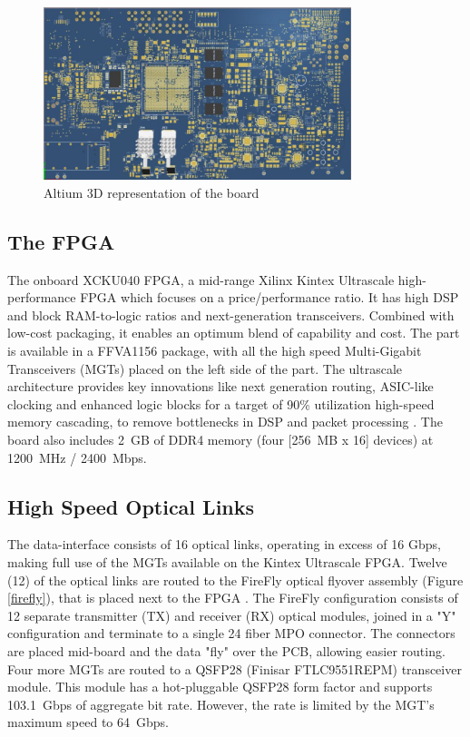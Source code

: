 \documentclass[a4paper]{PoS}
\begin{document}
\begin{figure}[h]
\centering
\includegraphics[width=0.8\textwidth]{board_3D_altium.png}
\caption{Altium 3D representation of the board}
\label{fig1}
\end{figure}



\subsection{The FPGA}
The onboard XCKU040 FPGA, a  mid-range Xilinx Kintex Ultrascale high-performance FPGA which focuses on a price/performance ratio. It has high DSP and block RAM-to-logic ratios and next-generation transceivers. Combined with low-cost packaging, it enables an optimum blend of capability and cost. The part is available in a FFVA1156 package, with all the high speed Multi-Gigabit Transceivers (MGTs)  placed on the left side of the part. The ultrascale architecture provides key innovations like next generation routing, ASIC-like clocking and enhanced logic blocks for a target of 90\% utilization high-speed memory cascading, to remove bottlenecks in DSP and packet processing \cite{mehta2013xilinx}.
The board also includes 2~GB of DDR4 memory (four [256~MB x 16] devices) at 1200~MHz / 2400~Mbps.



\subsection{High Speed Optical Links}
The data-interface consists of 16 optical links, operating in excess of 16 Gbps, making full use of the MGTs available on the Kintex Ultrascale FPGA. Twelve (12) of the optical links are routed to the FireFly optical flyover assembly (Figure \ref{firefly}), that is placed next to the FPGA \cite{zbinden2018connector}. The FireFly configuration consists of 12 separate transmitter (TX) and receiver (RX) optical modules, joined in a "Y" configuration and terminate to a single 24 fiber MPO connector. The connectors are placed mid-board and the data "fly" over the PCB, allowing easier routing. Four more MGTs are routed to a QSFP28 (Finisar FTLC9551REPM) transceiver module. This module has a hot-pluggable QSFP28 form factor and supports 103.1~Gbps of aggregate bit rate. However, the rate is limited by the MGT's maximum speed to 64~Gbps.
\end{document}
